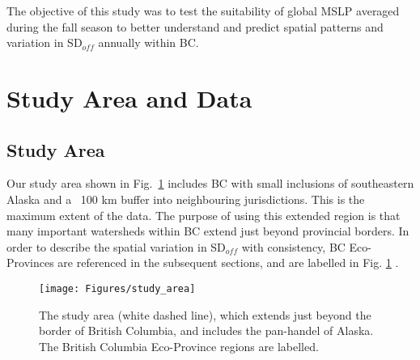 \documentclass{tATO2e}
\newcommand{\sdoff}{SD$_{off}$}
\begin{document}
\par
The objective of this study was to test the suitability of global MSLP averaged during the fall season to better understand and predict spatial patterns and variation in \sdoff{} annually within BC. 


\section{Study Area and Data}

\subsection{Study Area}
Our study area shown in Fig.~\ref{study-area} includes BC with small inclusions of southeastern Alaska and a ~100 km buffer into neighbouring jurisdictions. This is the maximum extent of the \cite{Bevington2019} data. The purpose of using this extended region is that many important watersheds within BC extend just beyond provincial borders. In order to describe the spatial variation in \sdoff{} with consistency, BC Eco-Provinces are referenced in the subsequent sections, and are labelled in Fig. \ref{study-area} \citep{BCEcoProv}.

\begin{figure}
	\begin{center}
		\texttt{[image: Figures/study\_area]}
		\caption{The study area (white dashed line), which extends just beyond the border of British Columbia, and includes the pan-handel of Alaska. The British Columbia Eco-Province regions are labelled.}
		\label{study-area}
	\end{center}
\end{figure}
\end{document}
